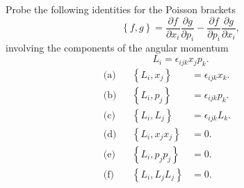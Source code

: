\documentclass[12pt]{article}
\newenvironment{problem}[2][Problem]{\begin{trivlist}
\item[\hskip \labelsep {\bfseries #1}\hskip \labelsep {\bfseries #2.}]}{\end{trivlist}}
\begin{document}
\begin{problem}{4}
Probe the following identities for the Poisson brackets
\begin{equation}
\left\{f,g\right\}=\frac{\partial f}{\partial x_i}\frac{\partial g}{\partial p_i}-\frac{\partial f}{\partial p_i}\frac{\partial g}{\partial x_i},
\end{equation}
involving the components of the angular momentum
\begin{equation}
L_i=\epsilon_{ijk}x_jp_k.
\end{equation}
\begin{align}
\text{(a)}& &\left\{L_i,x_j\right\}&=\epsilon_{ijk} x_k.&\qquad\\
\text{(b)}& &\left\{L_i,p_j\right\}&=\epsilon_{ijk} p_k.&\qquad\\
\text{(c)}& &\left\{L_i,L_j\right\}&=\epsilon_{ijk} L_k.&\qquad\\
\text{(d)}& &\left\{L_i,x_jx_j\right\}&=0.&\qquad\\
\text{(e)}&  &\left\{L_i,p_jp_j\right\}&=0.&\qquad\\
\text{(f)}&  &\left\{L_i,L_jL_j\right\}&=0.&\qquad
\end{align}


\end{problem}



 
\end{document}
